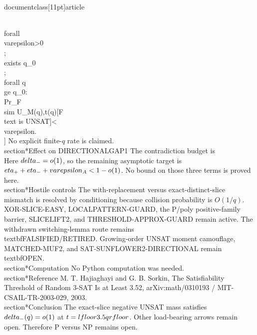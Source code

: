 \\documentclass[11pt]{article}
\begin{document}
\\forall\\varepsilon>0\\;\\exists q_0\\;\\forall q\\ge q_0:
\\Pr_{F\\sim U_{M(q),t(q)}}[F\\text{ is UNSAT}]<\\varepsilon.
\\]
No explicit finite-$q$ rate is claimed.
\\section*{Effect on DIRECTIONALGAP1}
The contradiction budget is
\\[
\\delta_-+\\eta_++\\eta_-+\\varepsilon_A<1.
\\]
Here $\\delta_-=o(1)$, so the remaining asymptotic target is $\\eta_++\\eta_-+\\varepsilon_A<1-o(1)$. No bound on those three terms is proved here.
\\section*{Hostile controls}
The with-replacement versus exact-distinct-slice mismatch is resolved by conditioning because collision probability is $O(1/q)$. XOR-SLICE-EASY, LOCALPATTERN-GUARD, the P/poly positive-family barrier, SLICELIFT2, and THRESHOLD-APPROX-GUARD remain active. The withdrawn switching-lemma route remains \\textbf{FALSIFIED/RETIRED}. Growing-order UNSAT moment camouflage, MATCHED-MUF2, and SAT-SUNFLOWER2-DIRECTIONAL remain \\textbf{OPEN}.
\\section*{Computation}
No Python computation was needed.
\\section*{Reference}
M. T. Hajiaghayi and G. B. Sorkin, The Satisfiability Threshold of Random 3-SAT Is at Least 3.52, arXiv:math/0310193 / MIT-CSAIL-TR-2003-029, 2003.
\\section*{Conclusion}
The exact-slice negative UNSAT mass satisfies $\\delta_-(q)=o(1)$ at $t=\\lfloor3.5q\\rfloor$. Other load-bearing arrows remain open. Therefore P versus NP remains open.
\
\end{document}
